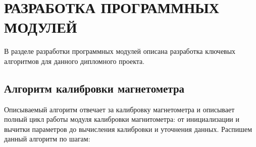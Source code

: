 \section{РАЗРАБОТКА ПРОГРАММНЫХ МОДУЛЕЙ}
\label{sec:dev}

В разделе разработки программных модулей
описана разработка ключевых алгоритмов для данного дипломного проекта.
\subsection{Алгоритм калибровки магнетометра}

Описываемый алгоритм отвечает за калибровку магнетометра и описывает полный цикл работы модуля калибровки магнитометра: от инициализации и вычитки параметров до
вычисления калибровки и уточнения данных. 
Распишем данный алгоритм по шагам:
